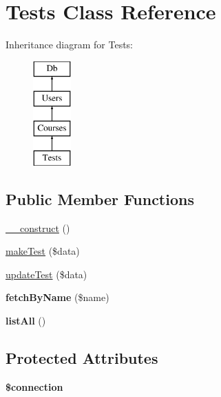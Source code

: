 \hypertarget{class_tests}{\section{Tests Class Reference}
\label{class_tests}
}
Inheritance diagram for Tests\-:\begin{figure}[H]
\begin{center}
\leavevmode
\includegraphics[height=4.000000cm]{class_tests}
\end{center}
\end{figure}
\subsection*{Public Member Functions}
\begin{DoxyCompactItemize}
\item 
\hyperlink{class_tests_a095c5d389db211932136b53f25f39685}{\-\_\-\-\_\-construct} ()
\item 
\hyperlink{class_tests_a72da384132fd1eb42dfad51c052ca553}{make\-Test} (\$data)
\item 
\hyperlink{class_tests_a615e2a92a28b88696873320d56041cde}{update\-Test} (\$data)
\item 
\hypertarget{class_tests_a7803b46e1b0460768e4f12c9abcf41a1}{{\bfseries fetch\-By\-Name} (\$name)}\label{class_tests_a7803b46e1b0460768e4f12c9abcf41a1}

\item 
\hypertarget{class_tests_a36f36c993f4da045e541d3b8818a2734}{{\bfseries list\-All} ()}\label{class_tests_a36f36c993f4da045e541d3b8818a2734}

\end{DoxyCompactItemize}
\subsection*{Protected Attributes}
\begin{DoxyCompactItemize}
\item 
\hypertarget{class_tests_a0d9c79b9b86b3f5891c6d3892f12c6a0}{{\bfseries \$connection}}\label{class_tests_a0d9c79b9b86b3f5891c6d3892f12c6a0}

\end{DoxyCompactItemize}
